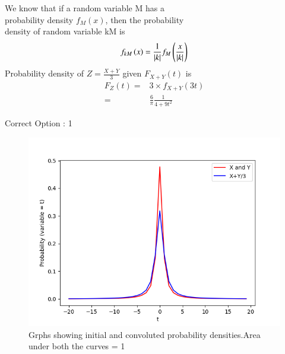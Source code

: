 \documentclass[journal,12pt,twocolumn]{IEEEtran}
\begin{document}
    We know that if a random variable M has a\\probability density $f_M(x)$, then the probability \\density of random variable kM is
    \begin{align}
        f_{kM}\left(x\right) = \frac{1}{\vert k\vert} f_M\left(\frac{x}{\vert k\vert}\right)
    \end{align}
    Probability density of $Z = \displaystyle\frac{X+Y}{3}$ given $F_{X+Y}(t)$ is
\begin{align}
    F_{Z}(t) = & 3\times \displaystyle f_{X+Y}(3t) \\
    =          & \frac{6}{\pi} \frac{1}{4+9{t}^2}
\end{align}
\begin{center}
    Correct Option : 1
\end{center}
\begin{figure}[H]
    \includegraphics[width = \columnwidth]{Assignment-8.png}
    \caption{Grphs showing initial and convoluted probability densities.Area under both the curves = 1}
\end{figure}
\end{document}
